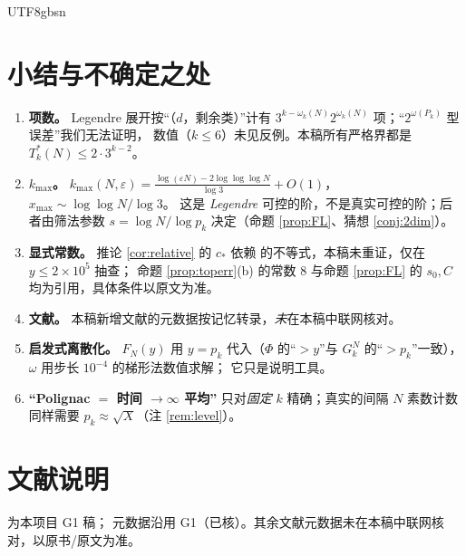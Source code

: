 \documentclass[11pt,a4paper]{article}
\newcommand{\Tmix}{T^{*}}               %
\newcommand{\kmax}{k_{\max}}
\theoremstyle{plain}
\theoremstyle{definition}
\begin{document}
\begin{CJK}{UTF8}{gbsn}
\section{小结与不确定之处}\label{sec:summary}

\begin{enumerate}[leftmargin=*]
\item \textbf{项数。} Legendre 展开按“（$d$，剩余类）”计有 $3^{k-\omega_k(N)}2^{\omega_k(N)}$ 项；“$2^{\omega(P_k)}$ 型误差”我们无法证明，
数值（$k\le6$）未见反例。本稿所有严格界都是 $\Tmix_k(N)\le2\cdot3^{k-2}$。
\item \textbf{$\kmax$。} $\kmax(N,\varepsilon)=\frac{\log(\varepsilon N)-2\log\log\log N}{\log3}+O(1)$，$x_{\max}\sim\log\log N/\log3$。
这是 \emph{Legendre} 可控的阶，不是真实可控的阶；后者由筛法参数 $s=\log N/\log p_k$ 决定（命题 \ref{prop:FL}、猜想 \ref{conj:2dim}）。
\item \textbf{显式常数。} 推论 \ref{cor:relative} 的 $c_*$ 依赖 \cite{RS62} 的不等式，本稿未重证，仅在 $y\le2\times10^5$ 抽查；
命题 \ref{prop:toperr}(b) 的常数 $8$ 与命题 \ref{prop:FL} 的 $s_0,C$ 均为引用，具体条件以原文为准。
\item \textbf{文献。} 本稿新增文献的元数据按记忆转录，\emph{未}在本稿中联网核对。
\item \textbf{启发式离散化。} $F_N(y)$ 用 $y=p_k$ 代入（$\Phi$ 的“$>y$”与 $G_k^N$ 的“$>p_k$”一致），$\omega$ 用步长 $10^{-4}$ 的梯形法数值求解；
它只是说明工具。
\item \textbf{“Polignac $=$ 时间 $\to\infty$ 平均”} 只对\emph{固定} $k$ 精确；真实的间隔 $N$ 素数计数同样需要 $p_k\approx\sqrt X$（注 \ref{rem:level}）。
\end{enumerate}

\section*{文献说明}
\cite{G1} 为本项目 G1 稿；\cite{HL23} 元数据沿用 G1（已核）。其余文献元数据未在本稿中联网核对，以原书/原文为准。


\end{CJK}
\end{document}
